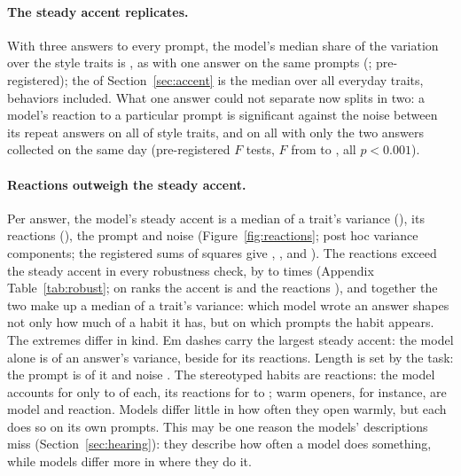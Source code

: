 \documentclass[11pt]{article}
\begin{document}
\paragraph{The steady accent replicates.}
With three answers to every prompt, the model's median share of the variation over the \repNTraits{} style traits is \repModel{}, as with one answer on the same prompts (\repModelOne; pre-registered); the \accentMedModel{} of Section~\ref{sec:accent} is the median over all \accentNTraits{} everyday traits, behaviors included.
What one answer could not separate now splits in two: a model's reaction to a particular prompt is significant against the noise between its repeat answers on all \repSig{} of \repNTraits{} style traits, and on all \repSigLater{} with only the two answers collected on the same day (pre-registered $F$ tests, $F$ from \repFMin{} to \repFMax{}, all $p<0.001$).

\paragraph{Reactions outweigh the steady accent.}
Per answer, the model's steady accent is a median \vcModel{} of a trait's variance (\vcModelCI), its reactions \vcReact{} (\vcReactCI), the prompt \vcPrompt{} and noise \vcNoise{} (Figure~\ref{fig:reactions}; post hoc variance components; the registered sums of squares give \repModel{}, \ssReact{}, \ssPrompt{} and \ssNoise{}).
The reactions exceed the steady accent in every robustness check, by \reactRatioLow{} to \reactRatio{} times (Appendix Table~\ref{tab:robust}; on ranks the accent is \robRanksModel{} and the reactions \robRanksReact{}), and together the two make up a median \vcModelReact{} of a trait's variance: which model wrote an answer shapes not only how much of a habit it has, but on which prompts the habit appears.
The extremes differ in kind.
Em dashes carry the largest steady accent: the model alone is \vcDashModel{} of an answer's variance, beside \vcDashReact{} for its reactions.
Length is set by the task: the prompt is \vcLengthPrompt{} of it and noise \vcLengthNoise.
The stereotyped habits are reactions: the model accounts for only \stereoModelLow{} to \stereoModelHigh{} of each, its reactions for \stereoReactLow{} to \stereoReactHigh{}; warm openers, for instance, are \vcWarmModel{} model and \vcWarmReact{} reaction.
Models differ little in how often they open warmly, but each does so on its own prompts.
This may be one reason the models' descriptions miss (Section~\ref{sec:hearing}): they describe how often a model does something, while models differ more in where they do it.
\end{document}

